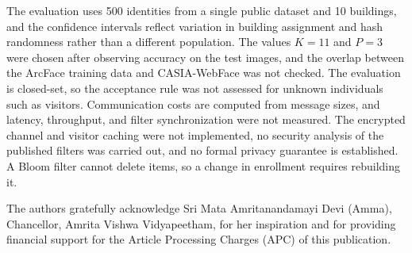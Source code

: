 \documentclass[pdflatex,sn-mathphys-num]{sn-jnl}%
\theoremstyle{thmstyleone}%
\theoremstyle{thmstyletwo}%
\theoremstyle{thmstylethree}%
\begin{document}
The evaluation uses 500 identities from a single public dataset and 10 buildings, and the confidence intervals reflect variation in building assignment and hash randomness rather than a different population. The values $K=11$ and $P=3$ were chosen after observing accuracy on the test images, and the overlap between the ArcFace training data and CASIA-WebFace was not checked. The evaluation is closed-set, so the acceptance rule was not assessed for unknown individuals such as visitors. Communication costs are computed from message sizes, and latency, throughput, and filter synchronization were not measured. The encrypted channel and visitor caching were not implemented, no security analysis of the published filters was carried out, and no formal privacy guarantee is established. A Bloom filter cannot delete items, so a change in enrollment requires rebuilding it.


The authors gratefully acknowledge Sri Mata Amritanandamayi Devi (Amma), Chancellor, Amrita Vishwa Vidyapeetham, for her inspiration and for providing financial support for the Article Processing Charges (APC) of this publication.

\end{document}
